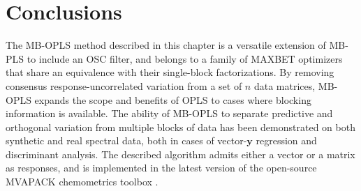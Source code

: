 \section{Conclusions}

\begin{doublespace}
The MB-OPLS method described in this chapter is a versatile extension of
MB-PLS to include an OSC filter, and belongs to a family of MAXBET optimizers
that share an equivalence with their single-block factorizations. By removing
consensus response-uncorrelated variation from a set of $n$ data matrices,
MB-OPLS expands the scope and benefits of OPLS to cases where blocking
information is available. The ability of MB-OPLS to separate predictive and
orthogonal variation from multiple blocks of data has been demonstrated on
both synthetic and real spectral data, both in cases of vector-$\mathbf{y}$
regression and discriminant analysis. The described algorithm admits either
a vector or a matrix as responses, and is implemented in the latest version
of the open-source MVAPACK chemometrics toolbox \cite{worley:acscb2014}.
\end{doublespace}




